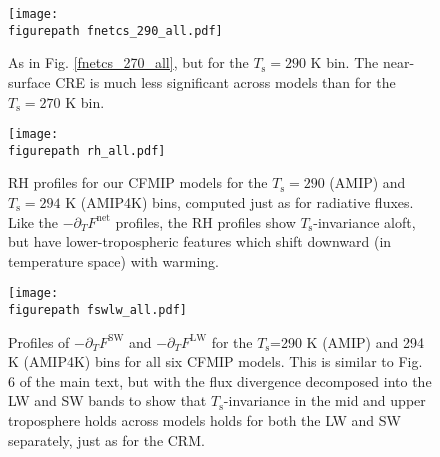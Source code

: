 \documentclass[9pt,twoside,lineno]{pnas-new}
\newcommand{\ppt}{\ensuremath{\partial_T}}
\newcommand{\FLW}{\ensuremath{F^\mathrm{LW}}}
\newcommand{\FSW}{\ensuremath{F^\mathrm{SW}}}
\newcommand{\Fnet}{\ensuremath{F^\mathrm{net}}}
\newcommand{\Ts}{\ensuremath{T_\mathrm{s}}}
\newcommand{\figurepath}{../../../figures_paper/}
\begin{document}
\begin{figure}[h]
        \begin{center}
                        \texttt{[image: \\figurepath fnetcs\_290\_all.pdf]}
                \caption{As in Fig. \ref{fnetcs_270_all},  but for the $\Ts= 290$ K bin. The near-surface CRE is much less significant across models than for the $\Ts= 270$ K bin.
                                \label{fnetcs_290_all}
                }
        \end{center}
\end{figure}

\begin{figure}[h]
        \begin{center}
                        \texttt{[image: \\figurepath rh\_all.pdf]}
                \caption{RH profiles for our CFMIP models for the $\Ts=290$ (AMIP) and  $\Ts= 294$ K (AMIP4K) bins, computed just as for radiative fluxes. Like the $-\ppt\Fnet$ profiles, the RH profiles show \Ts-invariance aloft, but have lower-tropospheric features which shift downward (in temperature space) with warming.
                                \label{rh_all}
                }
        \end{center}
\end{figure}

\begin{figure}[h!]
	\begin{center}
			\texttt{[image: \\figurepath fswlw\_all.pdf]}
		\caption{ Profiles of $-\ppt \FSW$ and $-\ppt \FLW$ for the \Ts=290 K (AMIP) and 294 K (AMIP4K) bins for all six CFMIP models. This is similar to Fig. 6 of the main text, but with the flux divergence decomposed into the LW and SW bands to show  that \Ts-invariance in the mid and upper troposphere holds across models holds for both the LW and SW separately, just as for the CRM. 
		\label{fswlw_all}
		}
	\end{center}
\end{figure}

\FloatBarrier


\end{document}
